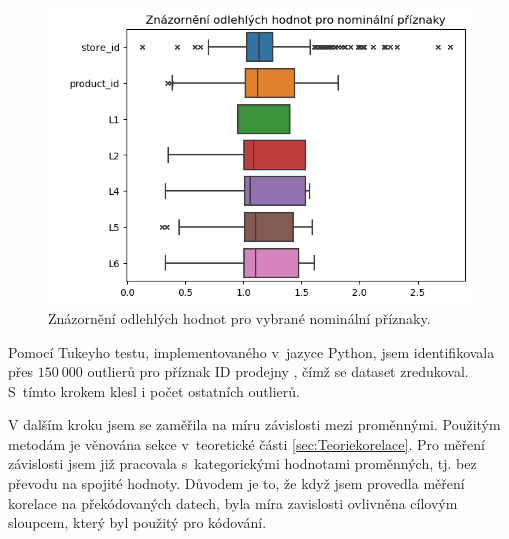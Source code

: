 \begin{figure}[hbtp!]
        \centering
        \captionsetup{justification=centering}
        
        \includegraphics[width=.6\textwidth]{obrazky/zntb/box_nominal.png}
        \caption{Znázornění odlehlých hodnot pro vybrané nominální příznaky.}
        \label{obr:rok:g:outlierN}

\end{figure}

Pomocí Tukeyho testu, implementovaného v~jazyce Python, jsem identifikovala přes $150\ 000$ outlierů pro příznak ID prodejny %
, čímž se dataset zredukoval. S~tímto krokem klesl i počet ostatních outlierů.

V dalším kroku jsem se zaměřila na míru závislosti mezi proměnnými. Použitým metodám je věnována sekce v~teoretické části \ref{sec:Teoriekorelace}. 
Pro měření závislosti jsem již pracovala s~kategorickými hodnotami proměnných, tj. bez převodu na spojité hodnoty. Důvodem je to, že když jsem provedla měření korelace na překódovaných datech, byla míra zavislosti ovlivněna cílovým sloupcem, který byl použitý pro kódování.

